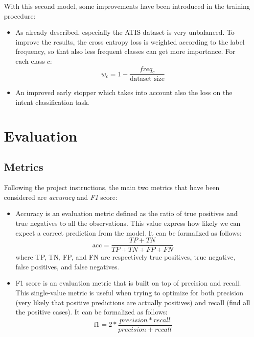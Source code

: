 \documentclass[a4paper]{article}
\begin{document}
With this second model, some improvements have been introduced in the training procedure:
\begin{itemize}
    \item As already described, especially the ATIS dataset is very unbalanced. To improve the results, the cross entropy loss is weighted according to the label frequency, so that also less frequent classes can get more importance. For each class $c$:
    \begin{equation*}
        w_c = 1 - \frac{freq_c}{\textrm{dataset size}}
    \end{equation*}
    \item An improved early stopper which takes into account also the loss on the intent classification task.
\end{itemize}
 

\section{Evaluation}

\subsection{Metrics}
Following the project instructions, the main two metrics that have been considered are \emph{accuracy} and \emph{F1} score:
\begin{itemize}
    \item Accuracy is an evaluation metric defined as the ratio of true positives and true negatives to all the observations. This value express how likely we can expect a correct prediction from the model. It can be formalized as follows:
    \begin{equation*}
        \textrm{acc} = \frac{TP + TN}{TP + TN + FP + FN}
    \end{equation*}
    where TP, TN, FP, and FN are respectively true positives, true negative, false positives, and false negatives.
    \item F1 score is an evaluation metric that is built on top of precision and recall. This single-value metric is useful when trying to optimize for both precision (very likely that positive predictions are actually positives) and recall (find all the positive cases). It can be formalized as follows:
    \begin{equation*}
        \textrm{f1} = 2 * \frac{precision * recall}{precision + recall}
    \end{equation*}
\end{itemize}
\end{document}
